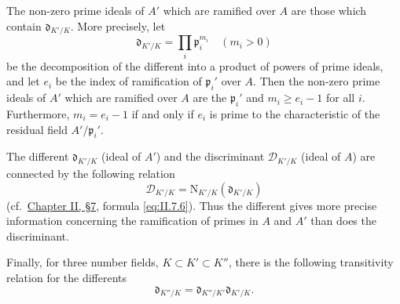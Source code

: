 The non-zero prime ideals of $A'$ which are ramified over $A$ are those
which contain $\mathfrak{d}_{K'/K}$. More precisely, let
\begin{equation}
\mathfrak{d}_{K'/K}=\prod_{i}\mathfrak{p}_{i}^{m_{i}}
\quad(m_{i}>0)
\label{eq:Supp.10}
\end{equation}
be the decomposition of the different into a product of powers of prime
ideals, and let $e_{i}$ be the index of ramification of
$\mathfrak{p}_{i}'$ over $A$. Then the non-zero prime ideals of $A'$ which
are ramified over $A$ are the $\mathfrak{p}_{i}'$ and
$m_{i}\geq e_{i}-1$ for all $i$. Furthermore, $m_{i}=e_{i}-1$ if and only
if $e_{i}$ is prime to the characteristic of the residual field
$A'/\mathfrak{p}_{i}'$.

The different $\mathfrak{d}_{K'/K}$ (ideal of $A'$) and the discriminant
$\mathcal{D}_{K'/K}$ (ideal of $A$) are connected by the following relation
\begin{equation}
\mathcal{D}_{K'/K}=\mathrm{N}_{K'/K}(\mathfrak{d}_{K'/K})
\label{eq:Supp.11}
\end{equation}
(cf.\ \hyperref[sec:2.7]{Chapter II, §7}, formula \eqref{eq:II.7.6}). Thus the different gives
more precise information concerning the ramification of primes in $A$ and
$A'$ than does the discriminant.

Finally, for three number fields, $K\subset K'\subset K''$, there is the
following transitivity relation for the differents
\begin{equation}
\mathfrak{d}_{K''/K}=\mathfrak{d}_{K''/K'}
\mathfrak{d}_{K'/K}.
\label{eq:Supp.12}
\end{equation}
